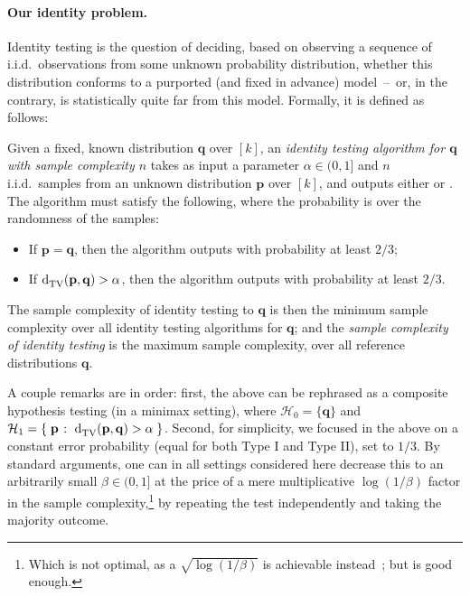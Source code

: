 \documentclass[10pt]{article}
\newcommand{\dst}{\alpha}
\newcommand{\ab}{k}
\newcommand{\ns}{n}
\newcommand{\errproba}{\beta}
\newcommand{\p}{\mathbf{p}}
\newcommand{\q}{\mathbf{q}}
\begin{document}
\paragraph{Our identity problem.} Identity testing is the question of deciding, based on observing a sequence of i.i.d.\ observations from some unknown probability distribution, whether this distribution conforms to a purported (and fixed in advance) model~--~or, in the contrary, is statistically quite far from this model. Formally, it is defined as follows:
\begin{definition}
  Given a fixed, known distribution $\q$ over $[\ab]$, an \emph{identity testing algorithm for $\q$ with sample complexity $\ns$} takes as input a parameter $\dst \in(0,1]$ and $\ns$ i.i.d.\ samples from an unknown distribution $\p$ over $[\ab]$, and outputs either \accept or \reject. The algorithm must satisfy the following, where the probability is over the randomness of the samples:
  \begin{itemize}
    \item If $\p=\q$, then the algorithm outputs \accept with probability at least $2/3$;
    \item If $\totalvardist{\p}{\q}>\dst$, then the algorithm outputs \reject with probability at least $2/3$.
  \end{itemize}
The sample complexity of identity testing to $\q$ is then the minimum sample complexity over all identity testing algorithms for $\q$; and the \emph{sample complexity of identity testing} is the maximum sample complexity, over all reference distributions $\q$.
\end{definition}
A couple remarks are in order: first, the above can be rephrased as a composite hypothesis testing (in a minimax setting), where $\mathcal{H}_0 = \{\q\}$ and $\mathcal{H}_1 = \setOfSuchThat{\p}{\totalvardist{\p}{\q} > \dst}$. Second, for simplicity, we focused in the above on a constant error probability (equal for both Type I and Type II), set to $1/3$. By standard arguments, one can in all settings considered here decrease this to an arbitrarily small $\errproba\in(0,1]$ at the price of a mere multiplicative $\log(1/\beta)$ factor in the sample complexity,\footnote{Which is not optimal, as a $\sqrt{\log(1/\beta)}$ is achievable instead~\cite{DiakonikolasGPP18}; but is good enough.} by repeating the test independently and taking the majority outcome.
\end{document}
